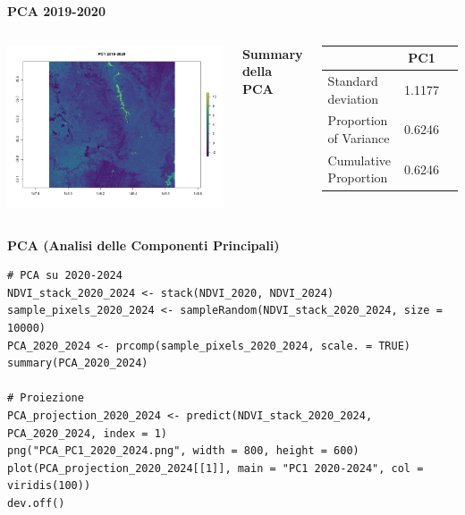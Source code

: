 \documentclass{beamer}
\begin{document}
\begin{frame}{\textbf{PCA 2019-2020}}
\begin{columns}
    \centering
    \includegraphics[width=\textwidth]{PCA_PC1_2019_2020.png}
    
    \centering
    \textbf{Summary della PCA}
    \begin{table}
        \centering
        \begin{tabular}{lcc}
            \toprule
            & PC1 \\
            \midrule
            Standard deviation     & 1.1177 \\
            Proportion of Variance & 0.6246 \\
            Cumulative Proportion  & 0.6246 \\
            \bottomrule
        \end{tabular}
    \end{table}
\end{columns}
\end{frame}

\begin{frame}[fragile]{\textbf{PCA (Analisi delle Componenti Principali)}}
\begin{lstlisting}
# PCA su 2020-2024
NDVI_stack_2020_2024 <- stack(NDVI_2020, NDVI_2024)
sample_pixels_2020_2024 <- sampleRandom(NDVI_stack_2020_2024, size = 10000)
PCA_2020_2024 <- prcomp(sample_pixels_2020_2024, scale. = TRUE)
summary(PCA_2020_2024)

# Proiezione
PCA_projection_2020_2024 <- predict(NDVI_stack_2020_2024, PCA_2020_2024, index = 1)
png("PCA_PC1_2020_2024.png", width = 800, height = 600)
plot(PCA_projection_2020_2024[[1]], main = "PC1 2020-2024", col = viridis(100))
dev.off()
\end{lstlisting}
\end{frame}
\end{document}
